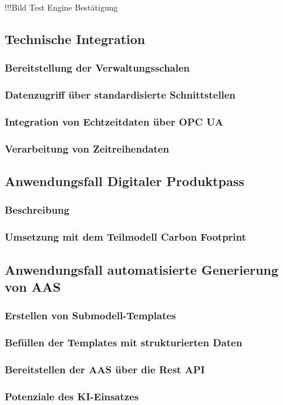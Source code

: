 !!!Bild Test Engine Bestätigung

\subsection{Technische Integration}
\subsubsection{Bereitstellung der Verwaltungsschalen}
\subsubsection{Datenzugriff über standardisierte Schnittstellen}
\subsubsection{Integration von Echtzeitdaten über OPC UA}
\subsubsection{Verarbeitung von Zeitreihendaten}
\subsection{Anwendungsfall Digitaler Produktpass}
\subsubsection{Beschreibung}
\subsubsection{Umsetzung mit dem Teilmodell Carbon Footprint}
\subsection{Anwendungsfall automatisierte Generierung von AAS}
\subsubsection{Erstellen von Submodell-Templates}
\subsubsection{Befüllen der Templates mit strukturierten Daten}
\subsubsection{Bereitstellen der AAS über die Rest API}
\subsubsection{Potenziale des KI-Einsatzes}